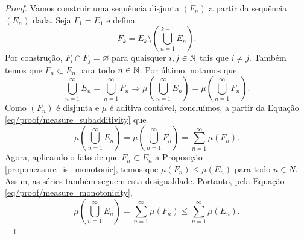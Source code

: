 \begin{proof}
    Vamos construir uma sequência disjunta $(F_n)$ a partir da sequência $(E_n)$ dada. Seja $F_1=E_1$ e defina
    \begin{equation*}
        F_k = E_k \setminus \left(\bigcup_{n=1}^{k-1} E_n\right).
    \end{equation*}
    Por construção, $F_i \cap F_j =\varnothing$ para quaisquer $i,j\in \mathbb{N}$ tais que $i\neq j$. Também temos que $F_n \subset E_n$ para todo $n\in \mathbb{N}$. Por último, notamos que
    \begin{equation}\label{eq/proof/measure_subadditivity}
        \bigcup_{n=1}^{\infty} E_n = \bigcup_{n=1}^{\infty} F_n \Longrightarrow \mu \left(\bigcup_{n=1}^{\infty} E_n\right) = \mu \left(\bigcup_{n=1}^{\infty} F_n\right).
    \end{equation}
    Como $(F_n)$ é disjunta e $\mu$ é aditiva contável, concluímos, a partir da Equação \eqref{eq/proof/measure_subadditivity} que
    \begin{equation}\label{eq/proof/measure_monotonicity}
        \mu \left(\bigcup_{n=1}^{\infty} E_n\right) = \mu \left(\bigcup_{n=1}^{\infty} F_n\right) = \sum_{n=1}^{\infty} \mu (F_n).
    \end{equation}
    Agora, aplicando o fato de que $F_n\subset E_n$ a Proposição \ref{prop:measure_is_monotonic}, temos que $\mu(F_n) \leq \mu(E_n)$ para todo $n\in N$. Assim, as séries também seguem esta desigualdade. Portanto, pela Equação \eqref{eq/proof/measure_monotonicity},
    \begin{equation*}
        \mu \left(\bigcup_{n=1}^{\infty} E_n\right) = \sum_{n=1}^{\infty} \mu (F_n)\leq \sum_{n=1}^{\infty} \mu (E_n).
    \end{equation*}
\end{proof}
